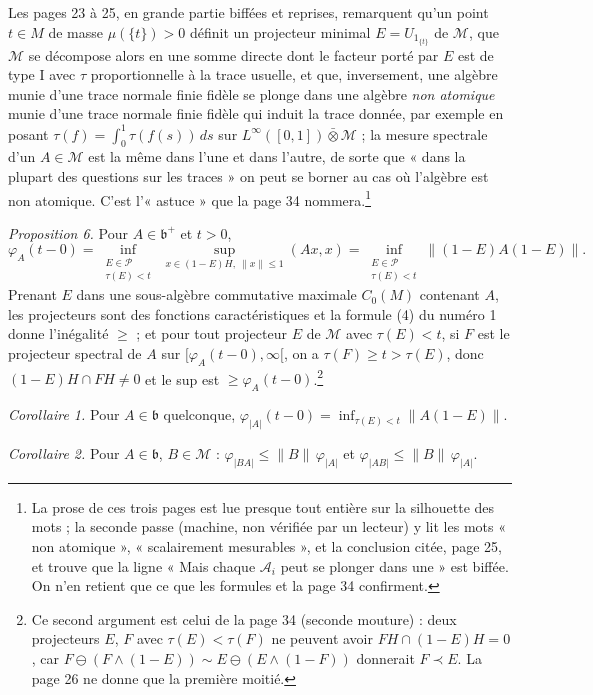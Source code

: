 \documentclass[11pt,a4paper]{article}
\begin{document}
Les pages 23 à 25, en grande partie biffées et reprises, remarquent qu'un
point $t \in M$ de masse $\mu(\{t\}) > 0$ définit un projecteur minimal
$E = U_{1_{\{t\}}}$ de $\mathcal{M}$, que $\mathcal{M}$ se décompose alors en
une somme directe dont le facteur porté par $E$ est de type I avec $\tau$
proportionnelle à la trace usuelle, et que, inversement, une algèbre munie
d'une trace normale finie fidèle se plonge dans une algèbre \emph{non
atomique} munie d'une trace normale finie fidèle qui induit la trace donnée,
par exemple en posant $\tau(f) = \int_0^1 \tau(f(s))\,ds$ sur
$L^\infty([0,1]) \mathbin{\bar\otimes} \mathcal{M}$ ; la mesure spectrale
d'un $A \in \mathcal{M}$ est la même dans l'une et dans l'autre, de sorte
que « dans la plupart des questions sur les traces » on peut se borner au
cas où l'algèbre est non atomique. C'est l'« astuce » que la page 34
nommera.\footnote{La prose de ces trois pages est lue presque tout entière
sur la silhouette des mots ; la seconde passe (machine, non vérifiée par un
lecteur) y lit les mots « non atomique », « scalairement mesurables », et
la conclusion citée, page 25, et trouve que la ligne « Mais chaque
$\mathcal{A}_i$ peut se plonger dans une » est biffée. On n'en retient que
ce que les formules et la page 34 confirment.}

\emph{Proposition 6.} Pour $A \in \mathfrak{b}^{+}$ et $t > 0$,
\[
  \varphi_A(t{-}0) = \inf_{\substack{E \in \mathcal{P}\\ \tau(E) < t}}
  \ \sup_{x \in (1-E)H,\ \|x\| \leq 1} (Ax, x)
  = \inf_{\substack{E \in \mathcal{P}\\ \tau(E) < t}} \|(1-E)A(1-E)\| .
\]
Prenant $E$ dans une sous-algèbre commutative maximale $C_0(M)$ contenant
$A$, les projecteurs sont des fonctions caractéristiques et la formule (4)
du numéro 1 donne l'inégalité $\geq$ ; et pour tout projecteur $E$ de
$\mathcal{M}$ avec $\tau(E) < t$, si $F$ est le projecteur spectral de $A$
sur $[\varphi_A(t{-}0), \infty[$, on a $\tau(F) \geq t > \tau(E)$, donc
$(1-E)H \cap FH \neq 0$ et le sup est $\geq \varphi_A(t{-}0)$.\footnote{Ce
second argument est celui de la page 34 (seconde mouture) : deux projecteurs
$E$, $F$ avec $\tau(E) < \tau(F)$ ne peuvent avoir $FH \cap (1-E)H = 0$, car
$F \ominus (F \wedge (1-E)) \sim E \ominus (E \wedge (1-F))$ donnerait
$F \prec E$. La page 26 ne donne que la première moitié.}

\emph{Corollaire 1.} Pour $A \in \mathfrak{b}$ quelconque,
$\varphi_{|A|}(t{-}0) = \inf_{\tau(E) < t} \|A(1-E)\|$.

\emph{Corollaire 2.} Pour $A \in \mathfrak{b}$, $B \in \mathcal{M}$ :
$\varphi_{|BA|} \leq \|B\|\,\varphi_{|A|}$ et $\varphi_{|AB|} \leq
\|B\|\,\varphi_{|A|}$.
\end{document}
